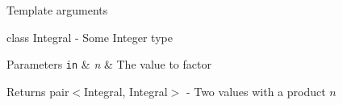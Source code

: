 Template arguments
\begin{DoxyItemize}
\item class Integral -\/ Some Integer type
\end{DoxyItemize}


\begin{DoxyParams}[1]{Parameters}
\mbox{\tt in}  & {\em n} & The value to factor \\
\hline
\end{DoxyParams}
\begin{DoxyReturn}{Returns}
pair$<$\+Integral, Integral$>$ -\/ Two values with a product $ n $ 
\end{DoxyReturn}
